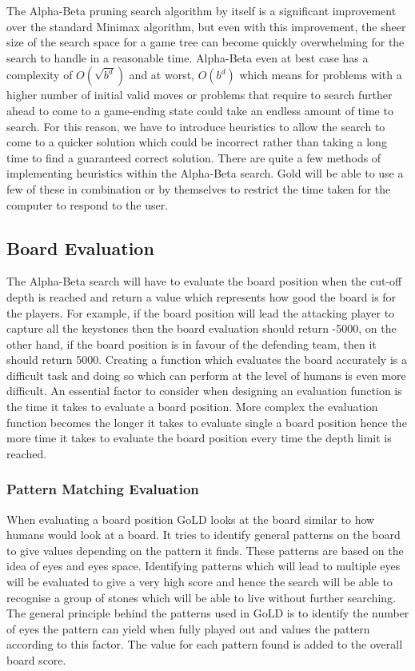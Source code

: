 \documentclass{l4proj}
\begin{document}
The Alpha-Beta pruning search algorithm by itself is a significant improvement over the standard Minimax algorithm, but even with this improvement, the sheer size of the search space for a game tree can become quickly overwhelming for the search to handle in a reasonable time. Alpha-Beta even at best case has a complexity of $O(\sqrt{b^d})$ and at worst, $O(b^d)$  which means for problems with a higher number of initial valid moves or problems that require to search further ahead to come to a game-ending state could take an endless amount of time to search. For this reason, we have to introduce heuristics to allow the search to come to a quicker solution which could be incorrect rather than taking a long time to find a guaranteed correct solution. There are quite a few methods of implementing heuristics within the Alpha-Beta search. Gold will be able to use a few of these in combination or by themselves to restrict the time taken for the computer to respond to the user.

\subsection{Board Evaluation}
The Alpha-Beta search will have to evaluate the board position when the cut-off depth is reached and return a value which represents how good the board is for the players. For example, if the board position will lead the attacking player to capture all the keystones then the board evaluation should return -5000,   on the other hand, if the board position is in favour of the defending team, then it should return 5000. Creating a function which evaluates the board accurately is a difficult task and doing so which can perform at the level of humans is even more difficult. An essential factor to consider when designing an evaluation function is the time it takes to evaluate a board position. More complex the evaluation function becomes the longer it takes to evaluate single a board position hence the more time it takes to evaluate the board position every time the depth limit is reached.

\subsubsection{Pattern Matching Evaluation}

When evaluating a board position GoLD looks at the board similar to how humans would look at a board. It tries to identify general patterns on the board to give values depending on the pattern it finds. These patterns are based on the idea of eyes and eyes space. Identifying patterns which will lead to multiple eyes will be evaluated to give a very high score and hence the search will be able to recognise a group of stones which will be able to live without further searching. The general principle behind the patterns used in GoLD is to identify the number of eyes the pattern can yield when fully played out and values the pattern according to this factor. The value for each pattern found is added to the overall board score.
\end{document}
